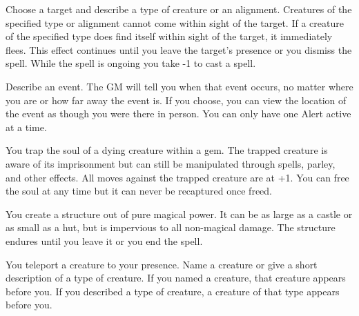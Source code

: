 

Choose a target and describe a type of creature or an alignment. Creatures of the specified type or alignment cannot come within sight of the target. If a creature of the specified type does find itself within sight of the target, it immediately flees. This effect continues until you leave the target's presence or you dismiss the spell. While the spell is ongoing you take -1 to cast a spell.



Describe an event. The GM will tell you when that event occurs, no matter where you are or how far away the event is. If you choose, you can view the location of the event as though you were there in person. You can only have one Alert active at a time.

\newpage
{}


You trap the soul of a dying creature within a gem. The trapped creature is aware of its imprisonment but can still be manipulated through spells, parley, and other effects. All moves against the trapped creature are at +1. You can free the soul at any time but it can never be recaptured once freed.



You create a structure out of pure magical power. It can be as large as a castle or as small as a hut, but is impervious to all non-magical damage. The structure endures until you leave it or you end the spell.



You teleport a creature to your presence. Name a creature or give a short description of a type of creature. If you named a creature, that creature appears before you. If you described a type of creature, a creature of that type appears before you.


